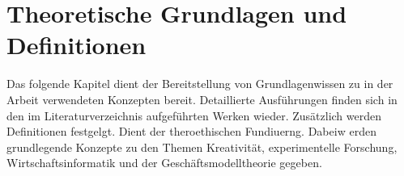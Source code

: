 \chapter{Theoretische Grundlagen und Definitionen}

Das folgende Kapitel dient der Bereitstellung von Grundlagenwissen zu in der Arbeit verwendeten Konzepten bereit. Detaillierte Ausführungen finden sich in den im Literaturverzeichnis aufgeführten Werken wieder. Zusätzlich werden Definitionen festgelgt.
Dient der theroethischen Fundiuerng. Dabeiw erden grundlegende Konzepte zu den Themen Kreativität, experimentelle Forschung, Wirtschaftsinformatik und der Geschäftsmodelltheorie gegeben.






